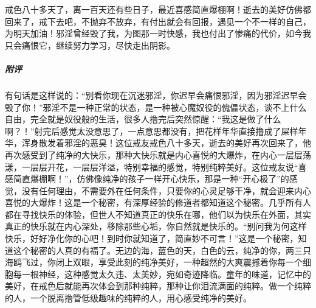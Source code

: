 \begin{case}
    戒色八十多天了，离一百天还有些日子，最近喜感简直爆棚啊！逝去的美好仿佛都回来了，戒下去吧，不抛弃不放弃，有付出就会有回报，遇见一个不一样的自己，为明天加油！邪淫曾经毁了我，为图那一时快感，我也付出了惨痛的代价，如今我只会痛恨它，继续努力学习，尽快走出阴影。
    \subparagraph{附评} 有句话是这样说的：“别看你现在沉迷邪淫，你迟早会痛恨邪淫，因为邪淫迟早会毁了你！”邪淫不是一种正常的状态，是一种被心魔奴役的傀儡状态，谈不上什么自由，完全就是奴役般的生活，很多人撸完后突然惊醒：“我这是做了什么啊？！”射完后感觉太没意思了，一点意思都没有，把花样年华直接撸成了屎样年华，浑身散发着邪淫的恶臭！这位戒友戒色八十多天，逝去的美好再次回来了，他再次感受到了纯净的大快乐，那种大快乐就是内心喜悦的大爆炸，在内心一层层荡漾，一层层开花，一层层洋溢，特别幸福的感觉，特别纯粹美好。这位戒友说“喜感简直爆棚啊！”，仿佛像纯净的孩子一样开心快乐，那是一种“开心极了”的感觉，没有任何理由，不需要外在任何条件，只要你的心灵足够干净，就会迎来内心喜悦的大爆炸！这是一个秘密，有深厚经验的修道者都知道这个秘密。几乎所有人都在寻找快乐的体验，但世人不知道真正的快乐在哪，他们以为快乐在外面，其实真正的快乐就在内心深处，移除那些心垢，你自然就是快乐的。“别问我为何这样快乐，好好净化你的心吧！到时你就知道了，简直妙不可言！”这是一个秘密，知道这个秘密的人真的有福了。无边的海，蓝色的天，白色的云，纯净的你，两三只海鸥飞过，你闭上双眼，享受此刻的纯净美好，一种超然的大爽震撼着你每一个细胞每一根神经，这种感觉太久违、太美妙，宛如奇迹降临。童年的味道，记忆中的美好，在戒色后就能再次体会到那种纯粹，那种让你泪流满面的纯粹。做一个纯粹的人，一个脱离撸管低级趣味的纯粹的人，用心感受纯净的美好。
\end{case}

